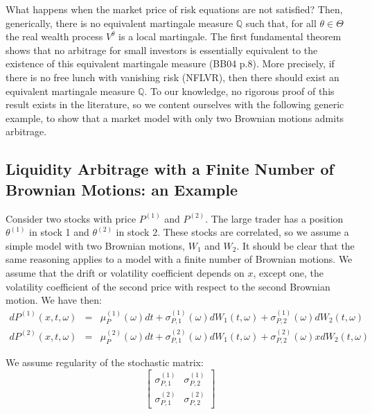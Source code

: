 \documentclass{article}
\begin{document}
\bigskip

What happens when the market price of risk equations are not satisfied?
Then, generically, there is no equivalent martingale measure $\mathbb{Q}$
such that, for all $\theta \in \Theta $ the real wealth process $V^{\theta }$
is a local martingale. The first fundamental theorem shows that no arbitrage
for small investors is essentially equivalent to the existence of this
equivalent martingale measure (BB04 p.8). More precisely, if there is no
free lunch with vanishing risk (NFLVR), then there should exist an
equivalent martingale measure $\mathbb{Q}$. To our knowledge, no rigorous
proof of this result exists in the literature, so we content ourselves with
the following generic example, to show that a market model with only two
Brownian motions admits arbitrage.

\bigskip

\subsection{Liquidity Arbitrage with a Finite Number of Brownian Motions: an
Example}

Consider two stocks with price $P^{(1)}$ and $P^{(2)}$. The large trader has
a position $\theta ^{(1)}$ in stock 1 and $\theta ^{(2)}$ in stock 2. These
stocks are correlated, so we assume a simple model with two Brownian
motions, $W_{1}$ and $W_{2}$. It should be clear that the same reasoning
applies to a model with a finite number of Brownian motions. We assume that
the drift or volatility coefficient depends on $x$, except one, the
volatility coefficient of the second price with respect to the second
Brownian motion. We have then:%
\begin{eqnarray*}
dP^{(1)}(x,t,\omega ) &=&\mu _{P}^{(1)}(\omega )dt+\sigma
_{P,1}^{(1)}(\omega )dW_{1}(t,\omega )+\sigma _{P,2}^{(1)}(\omega
)dW_{2}(t,\omega ) \\
dP^{(2)}(x,t,\omega ) &=&\mu _{P}^{(2)}(\omega )dt+\sigma
_{P,1}^{(2)}(\omega )dW_{1}(t,\omega )+\sigma _{P,2}^{(2)}(\omega
)xdW_{2}(t,\omega )
\end{eqnarray*}

We assume regularity of the stochastic matrix:
\begin{equation*}
\left[
\begin{array}{cc}
\sigma _{P,1}^{(1)} & \sigma _{P,2}^{(1)} \\
\sigma _{P,1}^{(2)} & \sigma _{P,2}^{(2)}%
\end{array}%
\right]
\end{equation*}
\end{document}
